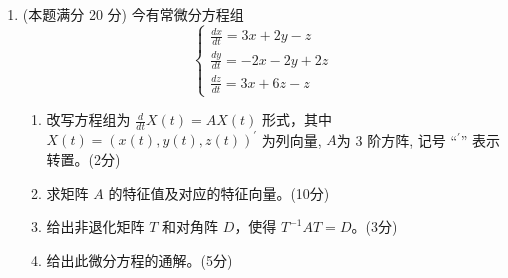 \begin{enumerate}
\item 
(本题满分 20 分)
今有常微分方程组
\[
\left\{\begin{array}{l}
	\frac{d x}{d t}=3 x+2 y-z \\
	\frac{d y}{d t}=-2 x-2 y+2 z \\
	\frac{d z}{d t}=3 x+6 z-z
\end{array}\right.
\]	
\begin{enumerate}
	\item
改写方程组为 $\frac{d}{d t} X(t)=A X(t)$ 形式，其中 $X(t)=(x(t), y(t), z(t))^{\prime}$ 为列向量, $A$为 3 阶方阵, 记号 “$  {}^{\prime}  $” 表示转置。(2分)
	
	
	\item
	求矩阵 $A$ 的特征值及对应的特征向量。(10分)
	
	
	\item
	给出非退化矩阵 $T$ 和对角阵 $D$，使得 $T^{-1} A T=D$。(3分)
	
	
	\item
	给出此微分方程的通解。(5分)
	
	
	
	
\end{enumerate}



\end{enumerate}
